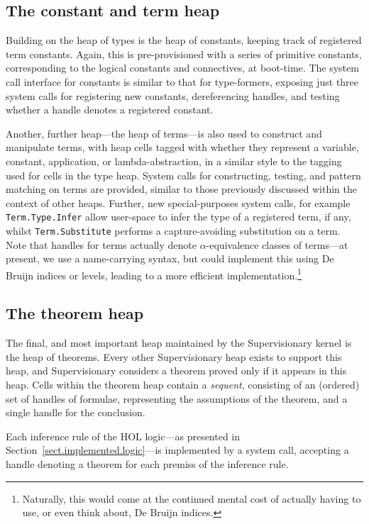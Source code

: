 \documentclass[a4paper, UKenglish, cleveref, autoref, thm-restate, colorlinks]{lipics-v2021}
\begin{document}
\subsection{The constant and term heap}

Building on the heap of types is the heap of constants, keeping track of registered term constants.
Again, this is pre-provisioned with a series of primitive constants, corresponding to the logical constants and connectives, at boot-time.
The system call interface for constants is similar to that for type-formers, exposing just three system calls for registering new constants, dereferencing handles, and testing whether a handle denotes a registered constant.

Another, further heap---the heap of terms---is also used to construct and manipulate terms, with heap cells tagged with whether they represent a variable, constant, application, or lambda-abstraction, in a similar style to the tagging used for cells in the type heap.
System calls for constructing, testing, and pattern matching on terms are provided, similar to those previously discussed within the context of other heaps.
Further, new special-purposes system calls, for example \texttt{Term.Type.Infer} allow user-space to infer the type of a registered term, if any, whilst \texttt{Term.Substitute} performs a capture-avoiding substitution on a term.
Note that handles for terms actually denote $\alpha$-equivalence classes of terms---at present, we use a name-carrying syntax, but could implement this using De Bruijn indices or levels, leading to a more efficient implementation.\footnote{Naturally, this would come at the continued mental cost of actually having to use, or even think about, De Bruijn indices.}

\subsection{The theorem heap}

The final, and most important heap maintained by the Supervisionary kernel is the heap of theorems.
Every other Supervisionary heap exists to support this heap, and Supervisionary considers a theorem proved only if it appears in this heap.
Cells within the theorem heap contain a \emph{sequent}, consisting of an (ordered) set of handles of formulae, representing the assumptions of the theorem, and a single handle for the conclusion.

Each inference rule of the HOL logic---as presented in Section~\ref{sect.implemented.logic}---is implemented by a system call, accepting a handle denoting a theorem for each premiss of the inference rule.
\end{document}
